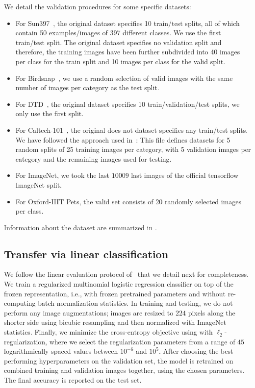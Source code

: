We detail the validation procedures for some specific datasets: 
\begin{itemize}
    \item For Sun397~\cite{sun397}, the original dataset specifies 10 train/test splits, all of which contain 50 examples/images of 397 different classes. We use the first train/test split. The original dataset specifies no validation split and therefore, the training images have been further subdivided into 40 images per class for the train split and 10 images per class for the valid split.
    \item For Birdsnap~\cite{Birdsnap}, we use a random selection of valid images with the same number of images per category as the test split.
    \item For DTD~\cite{dtd}, the original dataset specifies 10 train/validation/test splits, we only use the first split.
    \item For Caltech-101~\cite{caltech101}, the original does not dataset specifies any train/test splits. We have followed the approach used in~\cite{donahue2014decaf}: This file defines datasets for 5 random splits of 25 training images per category, with 5 validation images per category and the remaining images used for testing.
    \item For ImageNet, we took the last $10009$ last images of the official tensorflow ImageNet split.
    \item For Oxford-IIIT Pets, the valid set consists of 20 randomly selected images per class.	
\end{itemize}
Information about the dataset are summarized in .

\subsection{Transfer via linear classification}
We follow the linear evaluation protocol of~\cite{kolesnikov2019revisiting,kornblith2019better,SimCLR} that we detail next for completeness. 
We train a regularized multinomial logistic regression classifier on top of the frozen representation, i.e., with frozen pretrained parameters and without re-computing batch-normalization statistics.
In training and testing, we do not perform any image augmentations; images are resized to $224$ pixels along the shorter side using bicubic resampling and then normalized with ImageNet statistics.
Finally, we minimize the cross-entropy objective using \LBFGS with $\ell_2$-regularization, where we select the regularization parameters from a range of $45$ logarithmically-spaced values between $10^{-6}$ and $10^5$. After choosing the best-performing hyperparameters on the validation set, the model is retrained on combined training and validation images together, using the chosen parameters. The final accuracy is reported on the test set.

